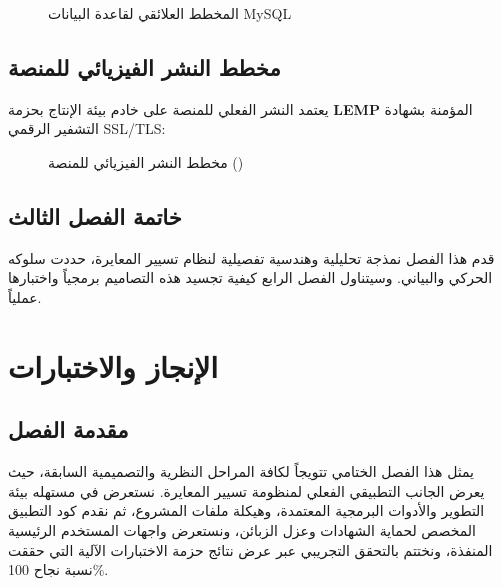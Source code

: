 \documentclass{bts-report-ar}
\begin{document}
\begin{figure}[H]
  \centering
  \begin{LTR}
  
  \end{LTR}
  \caption{المخطط العلائقي لقاعدة البيانات MySQL}
  \label{fig:db-cluster}
\end{figure}

\section{مخطط النشر الفيزيائي للمنصة}
يعتمد النشر الفعلي للمنصة على خادم بيئة الإنتاج بحزمة \textbf{LEMP} المؤمنة بشهادة التشفير الرقمي SSL/TLS:

\begin{figure}[H]
  \centering
  \begin{LTR}
  
  \end{LTR}
  \caption{مخطط النشر الفيزيائي للمنصة ()}
  \label{fig:deployment}
\end{figure}

\section*{خاتمة الفصل الثالث}
قدم هذا الفصل نمذجة تحليلية وهندسية تفصيلية لنظام تسيير المعايرة، حددت سلوكه الحركي والبياني. وسيتناول الفصل الرابع كيفية تجسيد هذه التصاميم برمجياً واختبارها عملياً.


\chapter{الإنجاز والاختبارات}

\section*{مقدمة الفصل}
يمثل هذا الفصل الختامي تتويجاً لكافة المراحل النظرية والتصميمية السابقة، حيث يعرض الجانب التطبيقي الفعلي لمنظومة تسيير المعايرة. نستعرض في مستهله بيئة التطوير والأدوات البرمجية المعتمدة، وهيكلة ملفات المشروع، ثم نقدم كود التطبيق المخصص لحماية الشهادات وعزل الزبائن، ونستعرض واجهات المستخدم الرئيسية المنفذة، ونختتم بالتحقق التجريبي عبر عرض نتائج حزمة الاختبارات الآلية التي حققت نسبة نجاح 100\%.
\end{document}
